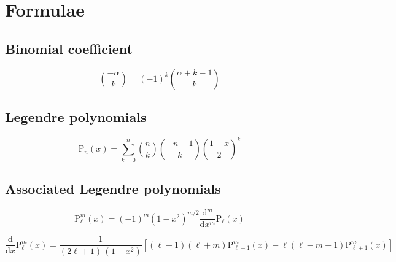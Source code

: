 \documentclass[10pt]{article}
\newcommand{\Plm}[2]{{\text{P}_{#1}^{#2}}}
\begin{document}
\appendix

\section{Formulae}

\subsection{Binomial coefficient}
\begin{equation}
\label{appendix:binom}
\binom{-\alpha}{k} = (-1)^k \binom{\alpha+k-1}{k}
\end{equation}


\subsection{Legendre polynomials}

\begin{equation}
\label{appendix:Pn}
\Plm{n}{}(x) = \sum_{k=0}^n \binom{n}{k} \binom{-n-1}{k} \left(\frac{1-x}{2}\right)^k
\end{equation}


\subsection{Associated Legendre polynomials}

\begin{equation}
\label{appendix:Plm}
\Plm{\ell}{m}(x) = (-1)^m (1-x^2)^{m/2} \frac{\mathrm{d}^m}{\mathrm{d}x^m} \Plm{\ell}{}(x)
\end{equation}

\begin{equation}
\label{appendix:dPlm}
\frac{\mathrm{d}}{\mathrm{d}x} \Plm{\ell}{m}(x) = \frac{1}{(2\ell+1) \, (1-x^2)} \left[ (\ell+1)(\ell+m)\Plm{\ell-1}{m}(x) - \ell(\ell-m+1)\Plm{\ell+1}{m}(x) \right]
\end{equation}

\clearpage
{}
\printbibliography
\end{document}
